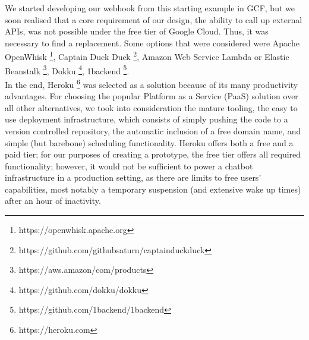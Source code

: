 We started developing our webhook from this starting example in GCF, but we soon realised that a core requirement of our design, the ability to call up external APIs, was not possible under the free tier of Google Cloud. Thus, it was necessary to find a replacement. Some options that were considered were Apache OpenWhisk \footnote{https://openwhisk.apache.org}, Captain Duck Duck \footnote{https://github.com/githubsaturn/captainduckduck}, Amazon Web Service Lambda or Elastic Beanstalk \footnote{https://aws.amazon/com/products}, Dokku \footnote{https://github.com/dokku/dokku}, 1backend \footnote{https://github.com/1backend/1backend}. \\
In the end, Heroku \footnote{https://heroku.com} was selected as a solution because of its many productivity advantages. For choosing the popular Platform as a Service (PaaS) solution over all other alternatives, we took into consideration the mature tooling, the easy to use deployment infrastructure, which consists of simply pushing the code to a version controlled repository, the automatic inclusion of a free domain name, and simple (but barebone) scheduling functionality. Heroku offers both a free and a paid tier; for our purposes of creating a prototype, the free tier offers all required functionality; however, it would not be sufficient to power a chatbot infrastructure in a production setting, as there are limits to free users' capabilities, most notably a temporary suspension (and extensive wake up times) after an hour of inactivity.

